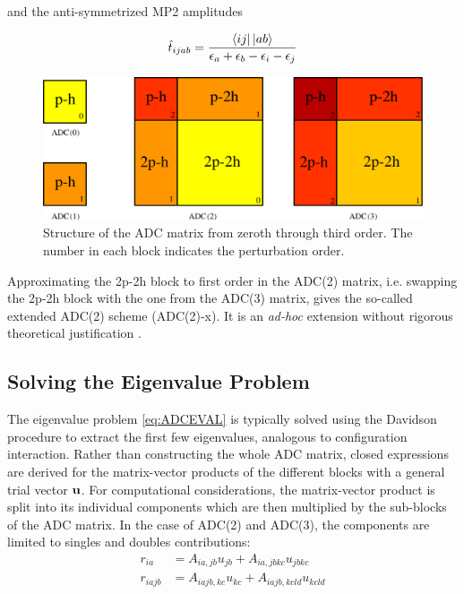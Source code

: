 and the anti-symmetrized MP2 amplitudes

\begin{equation}
\hat{t}_{ijab} = \frac{\sbra{ij}\sket{ab}}{\eps_a + \eps_b - \eps_i - \eps_j}
\end{equation}

\begin{figure}
\centering
\includegraphics[scale=0.4]{Pics/ADCMAT2}
\caption{Structure of the ADC matrix from zeroth through third order. The number in each block indicates the perturbation order.}
\label{fig:ADCMAT}
\end{figure}

Approximating the 2p-2h block to first order in the ADC(2) matrix, i.e. swapping the 2p-2h block with the one from the ADC(3) matrix, gives the so-called extended ADC(2) scheme (ADC(2)-x). It is an \emph{ad-hoc} extension without rigorous theoretical justification \cite{Tro1995}.  

\subsection{Solving the Eigenvalue Problem \label{sec:ADC_DAV}}

The eigenvalue problem \ref{eq:ADCEVAL} is typically solved using the Davidson procedure to extract the first few eigenvalues, analogous to configuration interaction. Rather than constructing the whole ADC matrix, closed expressions are derived for the matrix-vector products of the different blocks with a general trial vector $\mathbf{u}$. For computational considerations, the matrix-vector product is split into its individual components which are then multiplied by the sub-blocks of the ADC matrix. In the case of ADC(2) and ADC(3), the components are limited to singles and doubles contributions:
\begin{align}
r_{ia} &= A_{ia,jb} u_{jb} + A_{ia,jbkc} u_{jbkc} \\
r_{iajb} &= A_{iajb,kc} u_{kc} + A_{iajb,kcld} u_{kcld} 
\end{align}

